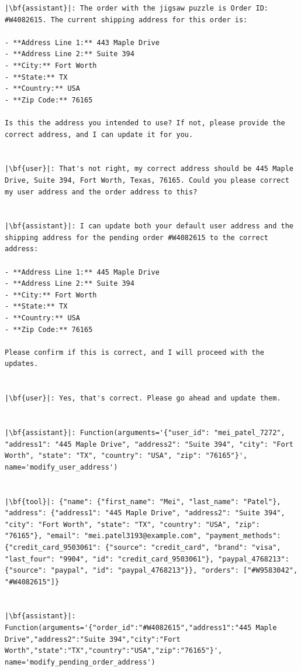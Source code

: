 \begin{verbatim}
|\bf{assistant}|: The order with the jigsaw puzzle is Order ID: #W4082615. The current shipping address for this order is:

- **Address Line 1:** 443 Maple Drive
- **Address Line 2:** Suite 394
- **City:** Fort Worth
- **State:** TX
- **Country:** USA
- **Zip Code:** 76165

Is this the address you intended to use? If not, please provide the correct address, and I can update it for you.


|\bf{user}|: That's not right, my correct address should be 445 Maple Drive, Suite 394, Fort Worth, Texas, 76165. Could you please correct my user address and the order address to this?


|\bf{assistant}|: I can update both your default user address and the shipping address for the pending order #W4082615 to the correct address:

- **Address Line 1:** 445 Maple Drive
- **Address Line 2:** Suite 394
- **City:** Fort Worth
- **State:** TX
- **Country:** USA
- **Zip Code:** 76165

Please confirm if this is correct, and I will proceed with the updates.


|\bf{user}|: Yes, that's correct. Please go ahead and update them.


|\bf{assistant}|: Function(arguments='{"user_id": "mei_patel_7272", "address1": "445 Maple Drive", "address2": "Suite 394", "city": "Fort Worth", "state": "TX", "country": "USA", "zip": "76165"}', name='modify_user_address')


|\bf{tool}|: {"name": {"first_name": "Mei", "last_name": "Patel"}, "address": {"address1": "445 Maple Drive", "address2": "Suite 394", "city": "Fort Worth", "state": "TX", "country": "USA", "zip": "76165"}, "email": "mei.patel3193@example.com", "payment_methods": {"credit_card_9503061": {"source": "credit_card", "brand": "visa", "last_four": "9904", "id": "credit_card_9503061"}, "paypal_4768213": {"source": "paypal", "id": "paypal_4768213"}}, "orders": ["#W9583042", "#W4082615"]}


|\bf{assistant}|: Function(arguments='{"order_id":"#W4082615","address1":"445 Maple Drive","address2":"Suite 394","city":"Fort Worth","state":"TX","country":"USA","zip":"76165"}', name='modify_pending_order_address')



\end{verbatim}
